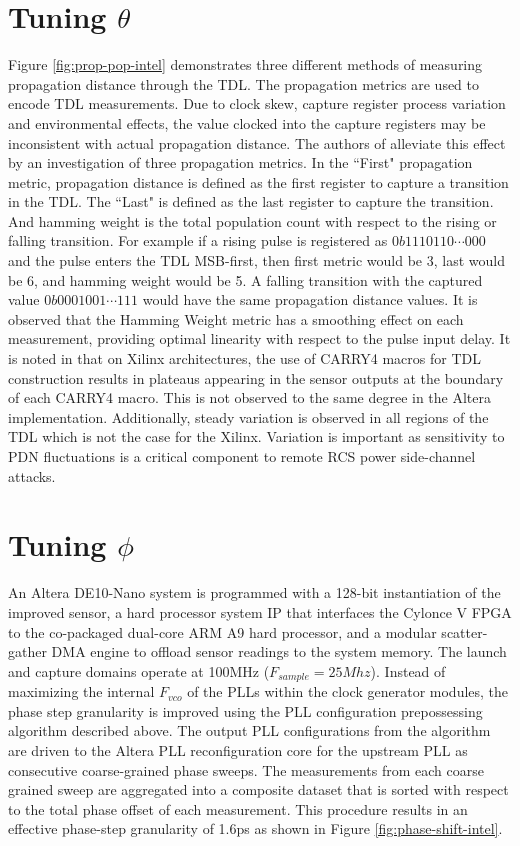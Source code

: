 

\section{Tuning $\theta$}
Figure \ref{fig:prop-pop-intel} demonstrates three different methods of
measuring propagation distance through the TDL. The propagation metrics
are used to encode TDL measurements. Due to clock skew, capture register
process variation and environmental effects, the value clocked into the
capture registers may be inconsistent with actual propagation distance.
The authors of \cite{prior} alleviate this effect by an investigation of
three propagation metrics. In the ``First" propagation metric,
propagation distance is defined as the first register to capture a
transition in the TDL. The ``Last" is defined as the last register to
capture the transition. And hamming weight is the total population count
with respect to the rising or falling transition. For example if a
rising pulse is registered as $0b1110110 \cdots 000$ and the pulse
enters the TDL MSB-first, then first metric would be 3, last would be 6,
and hamming weight would be 5. A falling transition with the captured
value $0b0001001 \cdots 111$ would have the same propagation distance
values. It is observed that the Hamming Weight metric has a smoothing
effect on each measurement, providing optimal linearity with respect to
the pulse input delay. It is noted in \cite{prior} that on Xilinx
architectures, the use of CARRY4 macros for TDL construction results in
plateaus appearing in the sensor outputs at the boundary of each CARRY4
macro. This is not observed to the same degree in the Altera
implementation. Additionally, steady variation is observed in all
regions of the TDL which is not the case for the Xilinx. Variation is
important as sensitivity to PDN fluctuations is a critical component to
remote RCS power side-channel attacks.

\section{Tuning $\phi$}

An Altera DE10-Nano system is programmed with a 128-bit instantiation of
the improved sensor, a hard processor system IP that interfaces the
Cylonce V FPGA to the co-packaged dual-core ARM A9 hard processor, and a
modular scatter-gather DMA engine to offload sensor readings to the
system memory. The launch and capture domains operate at 100MHz
($F_{sample}=25Mhz$). Instead of maximizing the internal $F_{vco}$ of
the PLLs within the clock generator modules, the phase step granularity
is improved using the PLL configuration prepossessing algorithm
described above. The output PLL configurations from the algorithm are
driven to the Altera PLL reconfiguration core for the upstream PLL as
consecutive coarse-grained phase sweeps. The measurements from each
coarse grained sweep are aggregated into a composite dataset that is
sorted with respect to the total phase offset of each measurement. This
procedure results in an effective phase-step granularity of 1.6ps as
shown in Figure \ref{fig:phase-shift-intel}.

